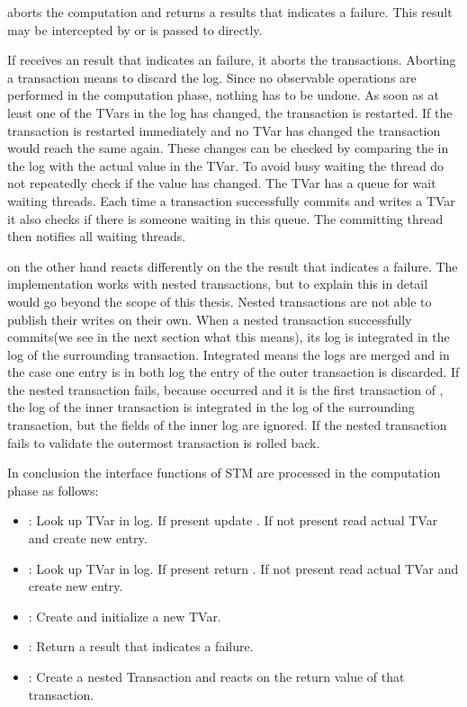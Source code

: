  aborts the computation and returns a results that indicates a failure. This result may be intercepted by 
 or is passed to  directly. 

If  receives an result that indicates an failure, it aborts the transactions. 
Aborting a transaction means to discard the log. Since no observable operations are performed in the computation phase, nothing has to be undone. 
As soon as at least one of the TVars in the log has changed, the transaction is restarted. If the transaction is restarted immediately and no 
TVar has changed the transaction would reach the same  again. These changes can be checked by comparing the  in
the log with the actual value in the TVar. To avoid busy waiting the thread do not repeatedly check if the value has changed. The TVar has a 
queue for wait waiting threads. Each time a transaction successfully commits and writes a TVar it also checks if there is someone waiting in 
this queue. The committing thread then notifies all waiting threads.

 on the other hand reacts differently on the the result that indicates a failure. The implementation works with nested transactions, 
but to explain this in detail would go beyond the scope of this thesis. Nested transactions are not able to publish their writes on their own.
When a nested transaction successfully commits(we see in the next section what this means), its log is integrated in the log of the surrounding transaction. 
Integrated means the logs are merged and in the case one entry is in both log the entry of the outer transaction is discarded.
If the nested transaction fails, because  occurred and it is the first transaction of , the log of the inner transaction
is integrated in the log of the surrounding transaction, but the  fields of the inner log are ignored. If the nested transaction
fails to validate the outermost transaction is rolled back.

In conclusion the interface functions of STM are processed in the computation phase as follows:
\begin{itemize}
 \item {}: Look up TVar in log. If present update . If not present read actual TVar and create new entry.
 \item {}: Look up TVar in log. If present return . If not present read actual TVar and create new entry.
 \item {}: Create and initialize a new TVar. 
 \item {}: Return a result that indicates a failure.
 \item {}: Create a nested Transaction and reacts on the return value of that transaction.
\end{itemize}

